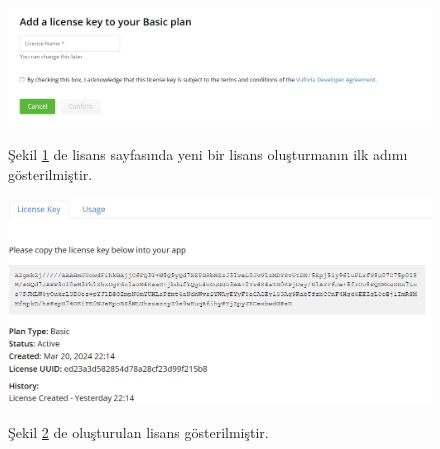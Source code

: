 \documentclass[12pt, a4paper]{article}
\begin{document}
	\begin{figure}[!ht]
		\caption{}
		\centering
		\includegraphics[angle=0, width=\textwidth]{Vuforia3.PNG}
		
		\label{gantt1}
		Şekil \ref{gantt1} de lisans sayfasında yeni bir lisans oluşturmanın ilk adımı gösterilmiştir.\cite{Vuforia}	
		
		
	\end{figure}
	\newpage
	\begin{figure}[!ht]
		\caption{}
		\centering
		\includegraphics[angle=0, width=\textwidth]{Vuforia4.PNG}
		
		\label{gantt2}
		Şekil \ref{gantt2} de oluşturulan lisans gösterilmiştir.\cite{Vuforia}	
	\end{figure}
	
\end{document}
